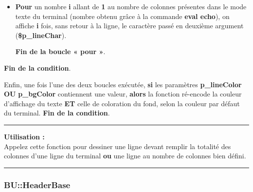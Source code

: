\documentclass[a4paper,10pt]{article}
\begin{document}
\begin{itemize}
    \item
    {
        \begin{justify}
            \textbf{\color{cyan}Pour} un nombre \textbf{\color{orange}i} allant de \textbf{\color{cyan}1} au nombre de colonnes présentes dans le mode texte du terminal (nombre obtenu grâce à la commande \textbf{\color{gray}eval echo}), on affiche \textbf{\color{orange}i} fois, sans retour à la ligne, le caractère passé en deuxième argument (\textbf{\color{orange}\$p\_lineChar}).
        \end{justify}\setlength{\parskip}{1em}

        \begin{justify}
            \textbf{\color{cyan}Fin de la boucle « pour »}.
        \end{justify}
    }
\end{itemize}

\begin{justify}
    \textbf{\color{brick}Fin de la condition}.
\end{justify}\setlength{\parskip}{2em}


\begin{justify}
    Enfin, une fois l'une des deux boucles exécutée, \textbf{\color{brick}si} les paramètres \textbf{\color{orange}p\_lineColor} \textbf{\color{brick}OU} \textbf{\color{orange}p\_bgColor} contiennent une valeur, \textbf{\color{brick}alors} la fonction ré-encode la couleur d'affichage du texte \textbf{ET} celle de coloration du fond, selon la couleur par défaut du terminal. \textbf{\color{brick}Fin de la condition}.
\end{justify}\setlength{\parskip}{1em}

\par\noindent\rule{\textwidth}{0.4pt}

\begin{justify}
    \textbf{Utilisation :}\\[1\baselineskip]
    Appelez cette fonction pour dessiner une ligne devant remplir la totalité des colonnes d'une ligne du terminal \textbf{ou} une ligne au nombre de colonnes bien défini.
\end{justify}



\color{blue}\par\noindent\rule{\textwidth}{0.4pt}\color{white}

\color{blue}
\subsubsection{BU::HeaderBase}\color{white}
\end{document}
